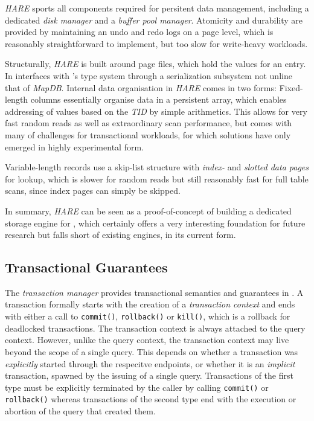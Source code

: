 \emph{HARE} sports all components required for persitent data management, including a dedicated \emph{disk manager} and a \emph{buffer pool manager}. Atomicity and durability are provided by maintaining an undo and redo logs on a page level, which is reasonably straightforward to implement, but too slow for write-heavy workloads.

Structurally, \emph{HARE} is built around page files, which hold the values for an entry. In interfaces with \cottontail{}'s type system through a serialization subsystem not unline that of \emph{MapDB}. Internal data organisation in \emph{HARE} comes in two forms: Fixed-length columns essentially organise data in a persistent array, which enables addressing of values based on the \emph{TID} by simple arithmetics. This allows for very fast random reads as well as extraordinary scan performance, but comes with many of challenges for transactional workloads, for which solutions have only emerged in highly experimental form.

Variable-length records use a skip-list structure with \emph{index-} and \emph{slotted data pages} for lookup, which is slower for random reads but still reasonably fast for full table scans, since index pages can simply be skipped.

In summary, \emph{HARE} can be seen as a proof-of-concept of building a dedicated storage engine for \cottontail, which certainly offers a very interesting foundation for future research but falls short of existing engines, in its current form.


\subsection{Transactional Guarantees}

The \emph{transaction manager} provides transactional semantics and guarantees in \cottontail. A transaction formally starts with the creation of a \emph{transaction context} and ends with either a call to \texttt{commit()}, \texttt{rollback()} or  \texttt{kill()}, which is a rollback for deadlocked transactions. The transaction context is always attached to the query context. However, unlike the query context, the transaction context may live beyond the scope of a single query. This depends on whether a transaction was \emph{explicitly} started through the respecitve endpoints, or whether it is an \emph{implicit} transaction, spawned by the issuing of a single query. Transactions of the first type must be explicitly terminated by the caller by calling  \texttt{commit()} or \texttt{rollback()} whereas transactions of the second type end with the execution or abortion of the query that created them.

